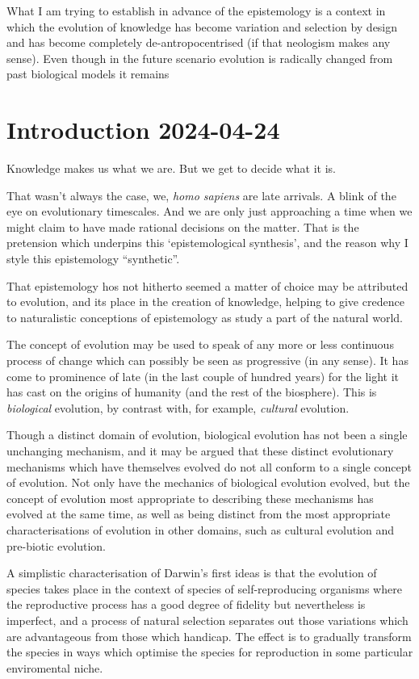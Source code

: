 \documentclass[10pt,titlepage]{book}
\begin{document}
What I am trying to establish in advance of the epistemology is a context in which the evolution of knowledge has become variation and selection by design and has become completely de-antropocentrised (if that neologism makes any sense).
Even though in the future scenario evolution is radically changed from past biological models it remains



\chapter{Introduction 2024-04-24}

Knowledge makes us what we are.
But we get to decide what it is.

That wasn't always the case, we, \emph{homo sapiens} are late arrivals.
A blink of the eye on evolutionary timescales.
And we are only just approaching a time when we might claim to have made rational decisions on the matter.
That is the pretension which underpins this `epistemological synthesis', and the reason why I style this epistemology ``synthetic''.

That epistemology hos not hitherto seemed a matter of choice may be attributed to evolution, and its place in the creation of knowledge, helping to give credence to naturalistic conceptions of epistemology as study a part of the natural world.

The concept of evolution may be used to speak of any more or less continuous process of change which can possibly be seen as progressive (in any sense).
It has come to prominence of late (in the last couple of hundred years) for the light it has cast on the origins of humanity (and the rest of the biosphere).
This is \emph{biological} evolution, by contrast with, for example, \emph{cultural} evolution.

Though a distinct domain of evolution, biological evolution has not been a single unchanging mechanism, and it may be argued that these distinct evolutionary mechanisms which have themselves evolved do not all conform to a single concept of evolution.
Not only have the mechanics of biological evolution evolved, but the concept of evolution most appropriate to describing these mechanisms has evolved at the same time, as well as being distinct from the most appropriate characterisations of evolution in other domains, such as cultural evolution and pre-biotic evolution.

A simplistic characterisation of Darwin's first ideas is that the evolution of species takes place in the context of species of self-reproducing organisms where the reproductive process has a good degree of fidelity but nevertheless is imperfect, and a process of natural selection separates out those variations which are advantageous from those which handicap.
The effect is to gradually transform the species in ways which optimise the species for reproduction in some particular enviromental niche.
\end{document}
